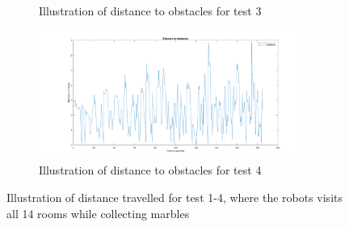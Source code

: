 \documentclass[../Head/Main.tex]{subfiles}
\begin{document}
\begin{figure}[H]
\begin{subfigure}[b]{0.49\textwidth}
    \caption{Illustration of distance to obstacles for test 3}
    \label{fig:MarbleTest3}
  \end{subfigure}
  \hfill
  \begin{subfigure}[b]{0.49\textwidth}
    \centering
    \includegraphics[width=0.95\textwidth]{../Figures/MatlabPlots/MarblesTest4}
    \caption{Illustration of distance to obstacles for test 4}
    \label{fig:MarbleTest4}
  \end{subfigure}
  \caption{Illustration of distance travelled for test 1-4, where the robots visits all 14 rooms while collecting marbles}
\end{figure}
\end{document}
